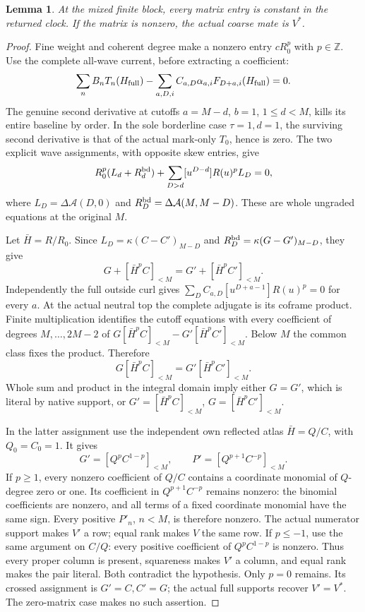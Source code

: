 \documentclass[11pt,a4paper]{amsart}
\numberwithin{equation}{section}
\theoremstyle{plain}
\newtheorem{lemma}[theorem]{Lemma}
\theoremstyle{definition}
\newcommand{\Z}{\mathbb Z}
\begin{document}
\begin{lemma}\label{ph:matrix-powers}
At the mixed finite block, every matrix entry is constant in the returned
clock.  If the matrix is nonzero, the actual coarse mate is \(V^*\).
\end{lemma}
\begin{proof}
Fine weight and coherent degree make a nonzero entry \(cR_0^p\) with
\(p\in\Z\).  Use the complete all-wave current, before extracting a
coefficient:
\[
 \sum_nB_nT_n(H_{\rm full})
       -\sum_{a,D,i}C_{a,D}\alpha_{a,i}F_{D+a,i}(H_{\rm full})=0.
\]
The genuine second derivative at cutoffs \(a=M-d\), \(b=1\),
\(1\le d<M\), kills its entire baseline by order.  In the sole
borderline case \(\tau=1,d=1\), the surviving second derivative is that
of the actual mark-only \(T_0\), hence is zero.
The two explicit wave assignments, with opposite skew entries, give
\[
 R_0^p(L_d+R_d^{\rm bd})
       +\sum_{D>d}[u^{D-d}]R(u)^pL_D=0,
\]
where \(L_D=\Delta\mathcal A(D,0)\) and
\(R_D^{\rm bd}=\Delta\mathcal A(M,M-D)\).
These are whole ungraded equations at the original \(M\).

Let \(\bar H=R/R_0\).  Since
\(L_D=\kappa(C-C')_{M-D}\) and
\(R_D^{\rm bd}=\kappa(G-G')_{M-D}\), they give
\[
 G+[\bar H^pC]_{<M}=G'+[\bar H^pC']_{<M}.
\]
Independently the full outside curl gives
\(\sum_DC_{a,D}[u^{D+a-1}]R(u)^p=0\) for every \(a\).
At the actual neutral top the complete adjugate is its coframe product.
Finite multiplication identifies the cutoff equations with every
coefficient of degrees \(M,\ldots,2M-2\) of
\(G[\bar H^pC]_{<M}-G'[\bar H^pC']_{<M}\).
Below \(M\) the common class fixes the product.  Therefore
\[
 G[\bar H^pC]_{<M}=G'[\bar H^pC']_{<M}.
\]
Whole sum and product in the integral domain imply either \(G=G'\),
which is literal by native support, or
\(G'=[\bar H^pC]_{<M}\), \(G=[\bar H^pC']_{<M}\).

In the latter assignment use the independent own reflected atlas
\(\bar H=Q/C\), with \(Q_0=C_0=1\).  It gives
\[
 G'=[Q^pC^{1-p}]_{<M},\qquad
 P'=[Q^{p+1}C^{-p}]_{<M}.
\]
If \(p\ge1\), every nonzero coefficient of \(Q/C\) contains a coordinate
monomial of \(Q\)-degree zero or one.  Its coefficient in
\(Q^{p+1}C^{-p}\) remains nonzero: the binomial coefficients are nonzero,
and all terms of a fixed coordinate monomial have the same sign.
Every positive \(P'_n\), \(n<M\), is therefore nonzero.
The actual numerator support makes \(V'\) a row; equal rank makes
\(V\) the same row.  If \(p\le-1\), use the same argument on \(C/Q\):
every positive coefficient of \(Q^pC^{1-p}\) is nonzero.
Thus every proper column is present, squareness makes \(V'\) a column,
and equal rank makes the pair literal.  Both contradict the hypothesis.
Only \(p=0\) remains.  Its crossed assignment is \(G'=C,C'=G\);
the actual full supports recover \(V'=V^*\).  The zero-matrix case
makes no such assertion.
\end{proof}
\end{document}
